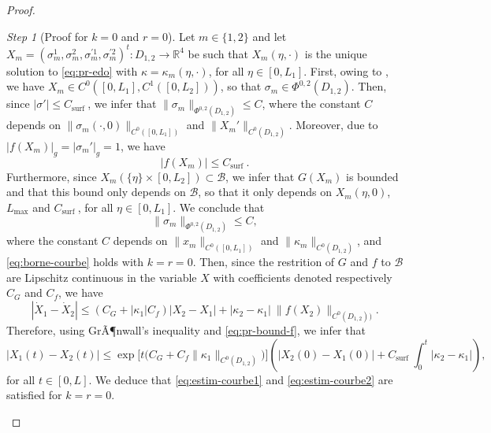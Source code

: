 \documentclass{article}
\newcommand{\Lmax}{L_{\max}}
\newcommand{\Csurf}{C_{\text{surf }}}
\newcommand{\R}{\mathbb{R}}
\newcommand{\ko}{\kappa}
\theoremstyle{remark}
\theoremstyle{prpart}
\newtheorem{proofpart}{Step}
\newcommand{\B}{\mathcal{B}}
\begin{document}
\begin{proof}
\begin{proofpart}[Proof for $k=0$ and $r=0$]
  Let $m\in\{1,2\}$ and let $X_m = (\sigma_m^1, \sigma_m^2, \sigma_m^{\prime 1}, \sigma_m^{\prime 2})^t:D_{1,2}\to\R^4$ be such that $X_m(\eta,\cdot)$ is the unique solution to \eqref{eq:pr-edo} with $\ko=\ko_m(\eta,\cdot)$, for all $\eta\in[0,L_1]$. First, owing to \cite[Chap. V, Th. 2.1]{Har64}, we have $X_m\in C^0([0,L_1], C^1([0,L_2]))$, so that $\sigma_m\in \Phi^{0,2}(D_{1,2})$. Then, since $|\sigma'|\leq\Csurf$, we infer that $\|\sigma_m\|_{\Phi^{0,2}(D_{1,2})}\leq C$, where the constant $C$ depends on $\|\sigma_m(\cdot,0)\|_{C^0([0,L_1])}$ and $\|X_m'\|_{C^0(D_{1,2})}$. Moreover, due to $|f(X_m)|_g = |\sigma_m'|_g=1$, we have
  \begin{equation}\label{eq:pr-bound-f}
    |f(X_m)|\leq \Csurf.
  \end{equation}
Furthermore, since $X_m(\{\eta\}\times[0,L_2])\subset \B$, we infer that $G(X_m)$ is bounded and that this bound only depends on $\B$, so that it only depends on $X_m(\eta,0)$, $\Lmax$ and $\Csurf$, for all $\eta\in[0,L_1]$. We conclude that
\begin{equation*}
  \|\sigma_m\|_{\Phi^{0,2}(D_{1,2})}\leq C,
\end{equation*}
where the constant $C$ depends on $\|x_m\|_{C^0([0,L_1])}$ and $\|\ko_m\|_{C^0(D_{1,2})}$, and \eqref{eq:borne-courbe} holds with $k=r=0$.
Then, since the restrition of $G$ and $f$ to $\B$ are Lipschitz continuous in the variable $X$ with coefficients denoted respectively $C_G$ and $C_f$, we have  
\begin{equation*}
  |\dot X_1 - \dot X_2| \leq (C_G+|\ko_1| C_f)|X_2-X_1|+|\ko_2-\ko_1| \ \|f(X_2)\|_{C^0(D_{1,2}))}.
\end{equation*} 
Therefore, using GrÃ¶nwall's inequality and \eqref{eq:pr-bound-f}, we infer that
\small
\begin{equation}
 \label{eq:reg-equ-geod}
 |X_1(t)-X_2(t)| \leq
  \exp\Big[t\big(C_G+C_f \|\ko_1\|_{C^0(D_{1,2})}\big)\Big]\left(|X_2(0) - X_1(0)| + \Csurf\int_0^t \left|\ko_2 - \ko_1\right| \right),
\end{equation}
\normalsize
for all $t\in[0,L]$. We deduce that \eqref{eq:estim-courbe1} and \eqref{eq:estim-courbe2} are satisfied for $k=r=0$. %
\end{proofpart}


\end{proof}
\end{document}
